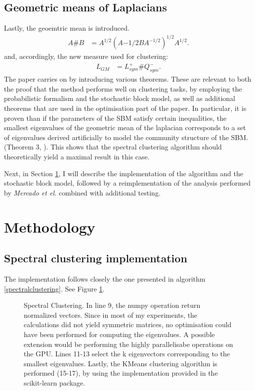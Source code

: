 \documentclass[11pt]{article}
\begin{document}
  \subsection{Geometric means of Laplacians} 
  Lastly, the geoemtric mean is introduced. 
  \begin{align*}
    A\#B &= A^{1/2}(A{-1/2}BA^{-1/2})^{1/2}A^{1/2}. 
  \end{align*}
  and, accordingly, the new measure used for clustering:
  \begin{align*}
    L_{GM} &= L^+_{sym} \# Q^-_{sym}. 
  \end{align*}
    The paper carries on by introducing various theorems. These are relevant to 
  both the proof that the method performs well on clustering tasks, by employing
  the probabilistic formalism and the stochastic block model, as well as 
  additional theorems that are used in the optimisation part of the paper.
    In particular, it is proven than if the parameters of the SBM satisfy
  certain inequalities, the smallest eigenvalues of the geometric mean of the 
  laplacian corresponds to a set of eigenvalues derived artificially to model
  the community structure of the SBM. (Theorem 3, \cite{mercado2016clustering}). 
  This shows that the  spectral clustering algorithm should theoretically yield 
  a maximal result in this case. 


  Next, in Section \ref{methods}, I will describe the implementation of the algorithm
  and the stochastic block model, followed by a reimplementation of the analysis 
  performed by \emph{Mercado et el.} combined with additional testing.

\section{Methodology}
\label{methods}
  \subsection{Spectral clustering implementation}

  The implementation follows closely the one presented in algorithm \ref{spectralclustering}. 
  See Figure \ref{figure:1}.
  
  \begin{figure}[!hbt]
    \label{figure:1}
    
    \caption{ 
      Spectral Clustering.
      In line 9, the numpy operation return normalized vectors.
      Since in most of my experiments, the calculations did not yield symmetric matrices,
      no optimisation could have been performed for computing the eigenvalues. A 
      possible extension would  be performing the highly parallelisabe operations 
      on the GPU.
      Lines 11-13 select the k eigenvectors corresponding to the smallest eigenvalues. 
      Lastly, the KMeans clustering algorithm is performed (15-17), by using the implementation
      provided in the scikit-learn package.      
    }
  \end{figure}
\end{document}

